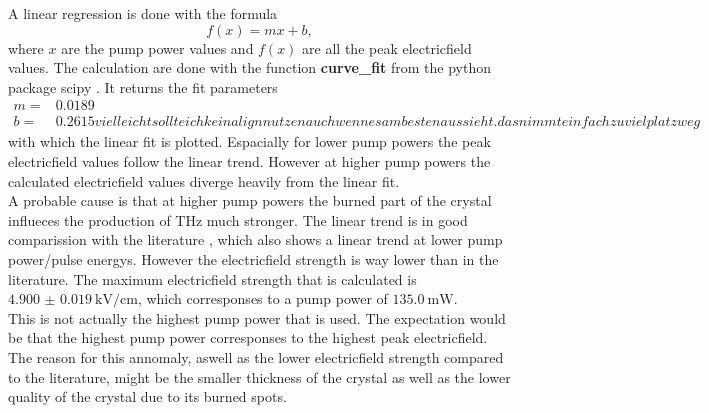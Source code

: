 A linear regression is done with the formula
\begin{equation}
    f(x) = mx + b,
    \label{eq:linear}
\end{equation}
where $x$ are the pump power values and $f(x)$ are all the peak electricfield values.
The calculation are done with the function \textbf{curve\_fit} from the python package scipy \cite{scipy}.
It returns the fit parameters 
\begin{align*}
    m =& 0.0189\\
    b =& 0.2615
    vielleicht sollte ich kein align nutzen auch wenn es am besten aussieht. das nimmt einfach zu viel platz weg
\end{align*}
with which the linear fit is plotted.
Espacially for lower pump powers the peak electricfield values follow the linear trend.
However at higher pump powers the calculated electricfield values diverge heavily from the linear fit.
\\
A probable cause is that at higher pump powers the burned part of the crystal influeces the production of $\si{\tera\hertz}$ much stronger.
The linear trend is in good comparission with the literature \cite{electric_field_compare}, which also shows a linear trend at lower pump power/pulse energys.
However the electricfield strength is way lower than in the literature.
The maximum electricfield strength that is calculated is $\SI{4.900(19)}{\kilo\V\per\centi\meter}$, which corresponses to a pump power of $\SI{135.0}{\milli\W}$.
\\
This is not actually the highest pump power that is used.
The expectation would be that the highest pump power corresponses to the highest peak electricfield.
The reason for this annomaly, aswell as the lower electricfield strength compared to the literature, might be the smaller thickness of the crystal as well as the lower quality of the crystal due to its burned spots.
\FloatBarrier

